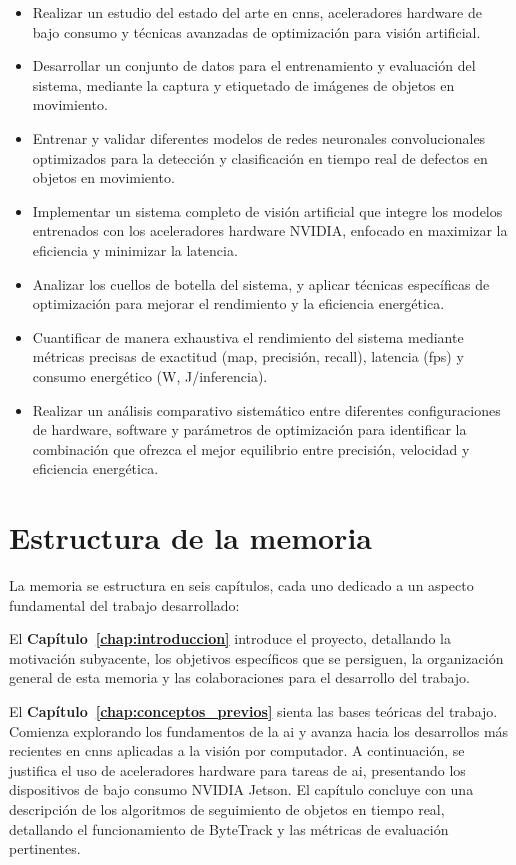 \documentclass[11pt,spanish,listoffigures,listoftables]{tfgetsinf}
\begin{document}
\begin{itemize}
   \item Realizar un estudio del estado del arte en \glspl{cnn}, aceleradores hardware de bajo consumo y técnicas avanzadas de optimización para visión artificial.
   \item Desarrollar un conjunto de datos para el entrenamiento y evaluación del sistema, mediante la captura y etiquetado de imágenes de objetos en movimiento.
   \item Entrenar y validar diferentes modelos de redes neuronales convolucionales optimizados para la detección y clasificación en tiempo real de defectos en objetos en movimiento.
   \item Implementar un sistema completo de visión artificial que integre los modelos entrenados con los aceleradores hardware NVIDIA, enfocado en maximizar la eficiencia y minimizar la latencia.
   \item Analizar los cuellos de botella del sistema, y aplicar técnicas específicas de optimización para mejorar el rendimiento y la eficiencia energética.
   \item Cuantificar de manera exhaustiva el rendimiento del sistema mediante métricas precisas de exactitud (\gls{map}, precisión, recall), latencia (\gls{fps}) y consumo energético (W, J/inferencia).
   \item Realizar un análisis comparativo sistemático entre diferentes configuraciones de hardware, software y parámetros de optimización para identificar la combinación que ofrezca el mejor equilibrio entre precisión, velocidad y eficiencia energética.
\end{itemize}

\section{Estructura de la memoria}\label{sec:estructura_memoria}

La memoria se estructura en seis capítulos, cada uno dedicado a un aspecto fundamental del trabajo desarrollado:

El \textbf{Capítulo~\ref{chap:introduccion}} introduce el proyecto, detallando la motivación subyacente, los objetivos específicos que se persiguen, la organización general de esta memoria y las colaboraciones para el desarrollo del trabajo.

El \textbf{Capítulo~\ref{chap:conceptos_previos}} sienta las bases teóricas del trabajo. Comienza explorando los fundamentos de la \gls{ai} y avanza hacia los desarrollos más recientes en \glspl{cnn} aplicadas a la visión por computador. A continuación, se justifica el uso de aceleradores hardware para tareas de \gls{ai}, presentando los dispositivos de bajo consumo NVIDIA Jetson. El capítulo concluye con una descripción de los algoritmos de seguimiento de objetos en tiempo real, detallando el funcionamiento de ByteTrack y las métricas de evaluación pertinentes.
\end{document}
